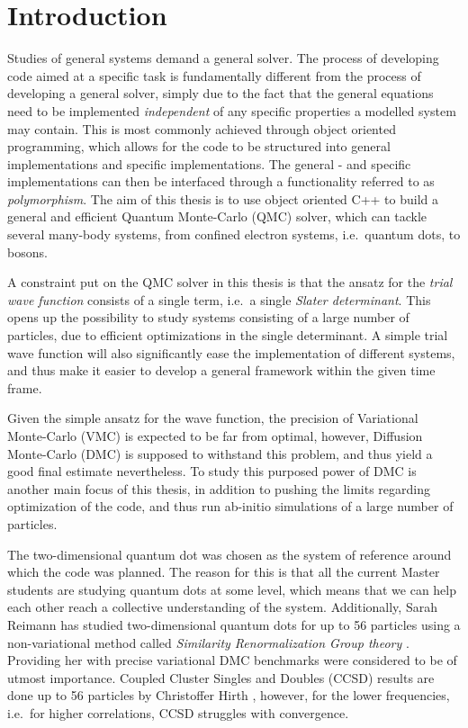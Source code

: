 \chapter{Introduction}

Studies of general systems demand a general solver. The process of developing code aimed at a specific task is fundamentally different from the process of developing a general solver, simply due to the fact that the general equations need to be implemented \textit{independent} of any specific properties a modelled system may contain. This is most commonly achieved through object oriented programming, which allows for the code to be structured into general implementations and specific implementations. The general - and specific implementations can then be interfaced through a functionality referred to as \textit{polymorphism}. The aim of this thesis is to use object oriented C++ to build a general and efficient Quantum Monte-Carlo (QMC) solver, which can tackle several many-body systems, from confined electron systems, i.e.~quantum dots, to bosons.  

A constraint put on the QMC solver in this thesis is that the ansatz for the \textit{trial wave function} consists of a single term, i.e.~a single \textit{Slater determinant}. This opens up the possibility to study systems consisting of a large number of particles, due to efficient optimizations in the single determinant. A simple trial wave function will also  significantly ease the implementation of different systems, and thus make it easier to develop a general framework within the given time frame.

Given the simple ansatz for the wave function, the precision of Variational Monte-Carlo (VMC) is expected to be far from optimal, however, Diffusion Monte-Carlo (DMC) is supposed to withstand this problem, and thus yield a good final estimate nevertheless. To study this purposed power of DMC is another main focus of this thesis, in addition to pushing the limits regarding optimization of the code, and thus run ab-initio simulations of a large number of particles.

The two-dimensional quantum dot was chosen as the system of reference around which the code was planned. The reason for this is that all the current Master students are studying quantum dots at some level, which means that we can help each other reach a collective understanding of the system. Additionally, Sarah Reimann has studied two-dimensional quantum dots for up to 56 particles using a non-variational method called \textit{Similarity Renormalization Group theory} \cite{verdensBesteArtikkel}. Providing her with precise variational DMC benchmarks were considered to be of utmost importance. Coupled Cluster Singles and Doubles (CCSD) results are done up to 56 particles by Christoffer Hirth \cite{Hirth}, however, for the lower frequencies, i.e.~for higher correlations, CCSD struggles with convergence.   

